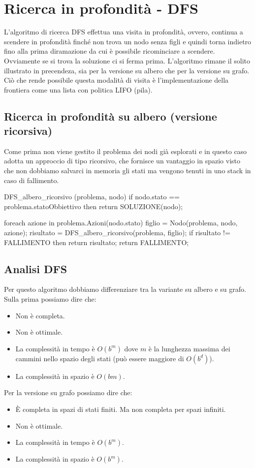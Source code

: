 \section{Ricerca in profondit\`a - DFS}
L'algoritmo di ricerca DFS effettua una visita in profondit\`a, ovvero, continua a scendere
in profondit\`a finch\'e non trova un nodo senza figli e quindi torna indietro fino alla
prima diramazione da cui \`e possibile ricominciare a scendere. Ovviamente se si trova la
soluzione ci si ferma prima. L'algoritmo rimane il solito illustrato in precendeza, sia per
la versione su albero che per la versione su grafo. Ci\`o che rende possibile questa
modalit\`a di visita \`e l'implementazione della frontiera come una lista con politica LIFO
(pila).

\subsection{Ricerca in profondit\`a su albero (versione ricorsiva)}
Come prima non viene gestito il problema dei nodi gi\`a esplorati e in questo caso adotta un
approccio di tipo ricorsivo, che fornisce un vantaggio in spazio visto che non dobbiamo
salvarci in memoria gli stati ma vengono tenuti in uno stack in caso di fallimento.
\noindent
\begin{pseudo}
	DFS_albero_ricorsivo (problema, nodo)
	if nodo.stato == problema.statoObbiettivo then
	return SOLUZIONE(nodo);

	foreach azione in problema.Azioni(nodo.stato)
	figlio = Nodo(problema, nodo, azione);
	risultato = DFS_albero_ricorsivo(problema, figlio);
	if risultato != FALLIMENTO then
	return risultato;
	return FALLIMENTO;
\end{pseudo}

\subsection{Analisi DFS}
Per questo algoritmo dobbiamo differenziare tra la variante su albero e su grafo. Sulla prima
possiamo dire che:
\begin{itemize}
	\item Non \`e completa.
	\item Non \`e ottimale.
	\item La complessit\`a in tempo \`e $O(b^m)$ dove $m$ \`e la lunghezza massima dei cammini
	      nello spazio degli stati (pu\`o essere maggiore di $O(b^d)$).
	\item La complessit\`a in spazio \`e $O(bm)$.
\end{itemize}
Per la versione su grafo possiamo dire che:
\begin{itemize}
	\item \`E completa in spazi di stati finiti. Ma non completa per spazi infiniti.
	\item Non \`e ottimale.
	\item La complessit\`a in tempo \`e $O(b^m)$.
	\item La complessit\`a in spazio \`e $O(b^m)$.
\end{itemize}


